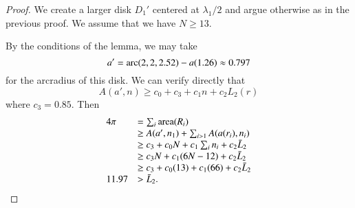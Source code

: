 \begin{proof}  We create
a larger disk $D_1'$ centered at $\lambda_1/2$ and argue otherwise
as in the previous proof.  We assume that we have $N\ge 13$.


By the conditions of the lemma, we may take 
$$a'=\operatorname{arc}(2,2,2.52)-a(1.26) \approx 0.797$$
for the arcradius of this disk.  We can verify directly that
$$A(a',n) \ge c_0+ c_3 + c_1 n + c_2 L_2(r)$$
where $c_3 = 0.85$.
Then 
$$
\begin{array}{lll}
4\pi &= \sum_i{\operatorname{area}}(R_i)\\
     &\ge A(a',n_1)+\sum_{i>1} A(a(r_i),n_i) \\
     &\ge c_3 + c_0 N +c_1\sum_i n_i + c_2 \bar L_2\\
     &\ge c_3 N +c_1 (6N-12) + c_2 \bar L_2\\
     &\ge c_3 + c_0 (13) +c_1 (66) + c_2 \bar L_2\\
11.97 &> \bar L_2. 
\end{array}
$$
\end{proof}


